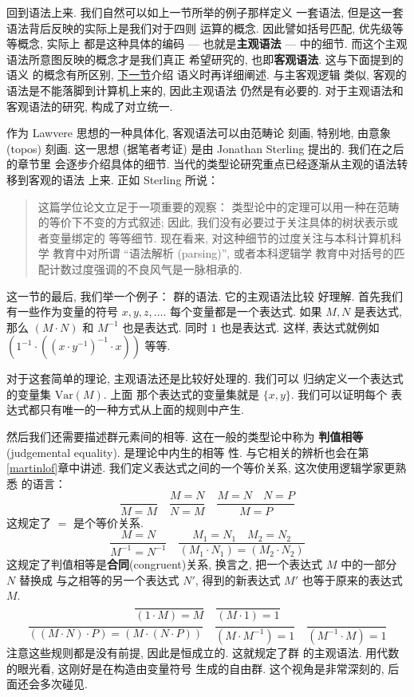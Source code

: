\documentclass[UTF8]{ctexbook}
\theoremstyle{plain}
\theoremstyle{definition}
\theoremstyle{remark}
\begin{document}
回到语法上来. 我们自然可以如上一节所举的例子那样定义
一套语法, 但是这一套语法背后反映的实际上是我们对于四则
运算的概念. 因此譬如括号匹配, 优先级等等概念, 实际上
都是这种具体的编码 --- 也就是\textbf{主观语法} ---
中的细节. 而这个主观语法所意图反映的概念才是我们真正
希望研究的, 也即\textbf{客观语法}. 这与下面提到的语义
的概念有所区别, \hyperref[intro:semantics]{下一节}介绍
语义时再详细阐述. 与主客观逻辑
类似, 客观的语法是不能落脚到计算机上来的, 因此主观语法
仍然是有必要的. 对于主观语法和客观语法的研究, 构成了对立统一.

作为 Lawvere 思想的一种具体化, 客观语法可以由范畴论
刻画, 特别地, 由意象 (topos) 刻画. 这一思想 (据笔者考证)
是由 Jonathan Sterling 提出的. 我们在之后的章节里
会逐步介绍具体的细节.
当代的类型论研究重点已经逐渐从主观的语法转移到客观的语法
上来. 正如 Sterling 所说：

\begin{quotation}
这篇学位论文立足于一项重要的观察：
类型论中的定理可以用一种在范畴的等价下不变的方式叙述;
因此, 我们没有必要过于关注具体的树状表示或者变量绑定的
等等细节. 现在看来, 对这种细节的过度关注与本科计算机科学
教育中对所谓 “语法解析 (parsing)”, 或者本科逻辑学
教育中对括号的匹配计数过度强调的不良风气是一脉相承的.
~\cite[(4.2)]{sterling:2021:thesis}
\end{quotation}

这一节的最后, 我们举一个例子： 群的语法. 它的主观语法比较
好理解. 首先我们有一些作为变量的符号 \(x,y,z,\dots\).
每个变量都是一个表达式. 如果 \(M, N\) 是表达式, 那么
\((M \cdot N)\) 和 \(M^{-1}\) 也是表达式. 同时
\(1\) 也是表达式. 这样, 表达式就例如
\((1^{-1} \cdot ((x \cdot y^{-1})^{-1} \cdot x))\) 等等.

对于这套简单的理论, 主观语法还是比较好处理的. 我们可以
归纳定义一个表达式的变量集 \(\mathrm{Var}(M)\). 上面
那个表达式的变量集就是 \(\{x, y\}\). 我们可以证明每个
表达式都只有唯一的一种方式从上面的规则中产生.

然后我们还需要描述群元素间的相等. 这在一般的类型论中称为%
\textbf{判值相等}(judgemental equality). 是理论中内生的相等
性. 与它相关的辨析也会在第\ref{martinlof}章中讲述.
我们定义表达式之间的一个等价关系, 这次使用逻辑学家更熟悉
的语言：
\[\frac{}{M = M}\quad
\frac{M = N}{N = M}\quad
\frac{M = N \quad N = P}{M = P}\]
这规定了 \(=\) 是个等价关系.
\[\frac{M = N}{M^{-1} = N^{-1}}\quad
\frac{M_1 = N_1\quad M_2 = N_2}
{(M_1 \cdot N_1) = (M_2 \cdot N_2)}\]
这规定了判值相等是\textbf{合同}(congruent)关系,
换言之, 把一个表达式 \(M\) 中的一部分 \(N\) 替换成
与之相等的另一个表达式 \(N'\), 得到的新表达式 \(M'\)
也等于原来的表达式 \(M\).
\[\frac{}{(1 \cdot M) = M}\quad
\frac{}{(M \cdot 1) = 1}\]
\[\frac{}{((M \cdot N) \cdot P)
= (M \cdot (N \cdot P))} \quad
\frac{}{(M \cdot M^{-1}) = 1}\quad
\frac{}{(M^{-1} \cdot M) = 1}\]
注意这些规则都是没有前提, 因此是恒成立的. 这就规定了群
的主观语法. 用代数的眼光看, 这刚好是在构造由变量符号
生成的自由群. 这个视角是非常深刻的, 后面还会多次碰见.
\end{document}
